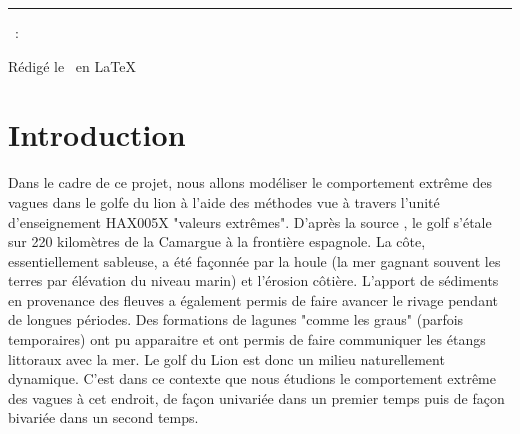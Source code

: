 \documentclass[a4paper,french,10pt]{article}
\begin{document}
	
	\title{\vspace{-1in}} %
	\author{} %
	\date{} %
	\maketitle %
	
	\usebox{\myReportTitle}
	\vspace{1in} %
	
	{\centering \huge \assignmentName \par}
	{\centering \noindent\rule{4in}{0.1pt} \par}
	\vspace{0.05in}
	{\centering \courseCode~: \courseName~ \par}
	{\centering Rédigé le \pubDate\ en \LaTeX \par}
	\vspace{1in}
	
	\tableofcontents
	\newpage
	
	

\section{Introduction}
Dans le cadre de ce projet, nous allons modéliser le comportement extrême des vagues dans le golfe du lion à l'aide des méthodes vue à travers l'unité d'enseignement HAX005X "valeurs extrêmes". D'après la source \cite{golfLion}, le golf s'étale sur 220 kilomètres de la Camargue à la frontière espagnole. La côte, essentiellement sableuse, a été façonnée par la houle (la mer gagnant souvent les terres par élévation du niveau marin) et l'érosion côtière. L'apport de sédiments en provenance des fleuves a également permis de faire avancer le rivage pendant de longues périodes. Des formations de lagunes "comme les graus" (parfois temporaires) ont pu apparaitre et ont permis de faire communiquer les étangs littoraux avec la mer. Le golf du Lion est donc un milieu naturellement dynamique. C'est dans ce contexte que nous étudions le comportement extrême des vagues à cet endroit, de façon univariée dans un premier temps puis de façon bivariée dans un second temps. 
\end{document}
